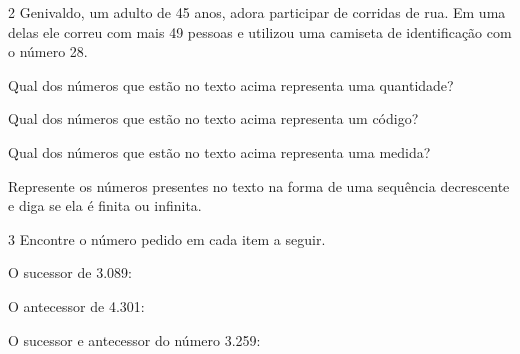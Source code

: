 \num{2} Genivaldo, um adulto de 45 anos, adora participar de corridas de
rua. Em uma delas ele correu com mais 49 pessoas e utilizou uma camiseta
de identificação com o número 28.

\begin{escolha}
\item
  Qual dos números que estão no texto acima representa uma
  quantidade?

\item {}

\item
  Qual dos números que estão no texto acima representa um
  código?

\item {}

\item
  Qual dos números que estão no texto acima representa uma
  medida?

\item {}

\item
  Represente os números presentes no texto na forma de uma sequência
  decrescente e diga se ela é finita ou infinita.

\item {}
\end{escolha}

\num{3} Encontre o número pedido em cada item a seguir.

\begin{escolha}
\item
  O sucessor de 3.089: 
\item
  O antecessor de 4.301: 
\item
  O sucessor e antecessor do número 3.259: 
\end{escolha}


